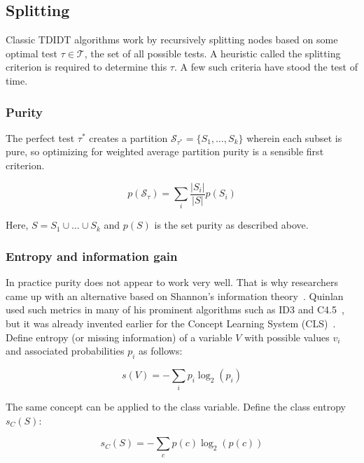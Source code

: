 
\subsection{Splitting}
Classic TDIDT algorithms work by recursively splitting nodes based on some optimal test $\tau \in \mathcal{T}$, the set of all possible tests. A heuristic called the splitting criterion is required to determine this $\tau$. A few such criteria have stood the test of time.

\subsubsection{Purity}
The perfect test $\tau^*$ creates a partition $\mathcal{S}_{\tau^*} = \{S_1, \ldots, S_k\}$ wherein each subset is pure, so optimizing for weighted average partition purity is a sensible first criterion.

\begin{equation}
    p(\mathcal{S}_\tau) = \sum_i \frac{|S_i|}{|S|} p(S_i)
\end{equation}

Here, $S = S_1 \cup \ldots \cup S_k$ and $p(S)$ is the set purity as described above.

\subsubsection{Entropy and information gain}
In practice purity does not appear to work very well. That is why researchers came up with an alternative based on Shannon's information theory~\cite{shannon1948mathematical}. Quinlan used such metrics in many of his prominent algorithms such as ID3 and C4.5~\cite{id3ter, c45}, but it was already invented earlier for the Concept Learning System (CLS)~\cite{cls}. Define entropy (or missing information) of a variable $V$ with possible values $v_i$ and associated probabilities $p_i$ as follows:

\begin{equation}
    s(V) = - \sum_i p_i \log_2(p_i)
\end{equation}

The same concept can be applied to the class variable. Define the class entropy $s_C(S)$:

\begin{equation}
    s_C(S) = - \sum_c p(c) \log_2(p(c))
\end{equation}

